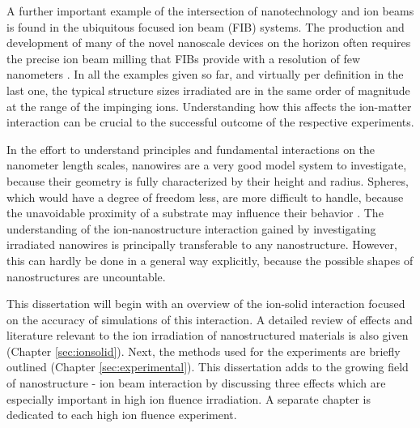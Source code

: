 A further important example of the intersection of nanotechnology and ion beams is found in the ubiquitous focused ion beam (FIB) systems. The production and development of many of the novel nanoscale devices on the horizon often requires the precise ion beam milling that FIBs provide with a resolution of few nanometers \cite{kranz_integrating_2001,george_nanopore_2010,chalapat_self-organized_2013}. In all the examples given so far, and virtually per definition in the last one, the typical structure sizes irradiated are in the same order of magnitude at the range of the impinging ions. Understanding how this affects the ion-matter interaction can be crucial to the successful outcome of the respective experiments.

In the effort to understand principles and fundamental interactions on the nanometer length scales, nanowires are a very good model system to investigate, because their geometry is fully characterized by their height and radius. Spheres, which would have a degree of freedom less, are more difficult to handle, because the unavoidable proximity of a substrate may influence their behavior \cite{hu_burrowing_2002,klimmer_size-dependent_2009,moller_tri3dyn_2014,johannes_ion_2015}. The understanding of the ion-nanostructure interaction gained by investigating irradiated nanowires is principally transferable to any nanostructure. However, this can hardly be done in a general way explicitly, because the possible shapes of nanostructures are uncountable.

This dissertation will begin with an overview of the ion-solid interaction focused on the accuracy of simulations of this interaction. A detailed review of effects and literature relevant to the ion irradiation of nanostructured materials is also given (Chapter \ref{sec:ionsolid}). Next, the methods used for the experiments are briefly outlined (Chapter \ref{sec:experimental}). This dissertation adds to the growing field of nanostructure - ion beam interaction by discussing three effects which are especially important in high ion fluence irradiation. A separate chapter is dedicated to each high ion fluence experiment. 
 
